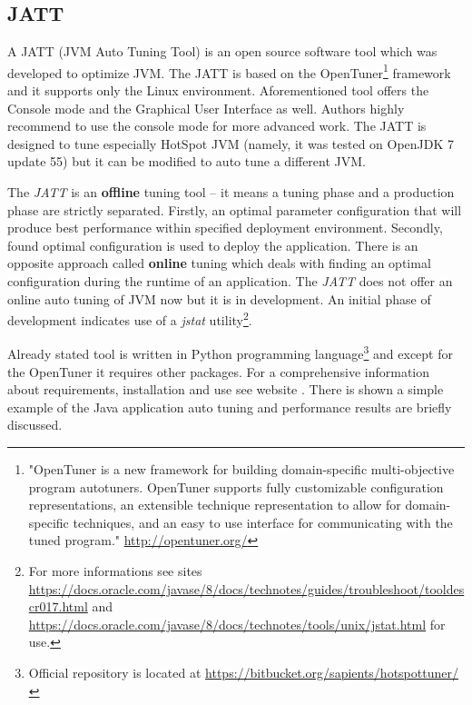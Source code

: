 \documentclass[
  digital, %
  oneside,
  notable, %
  nolof,     %
  nolot     %
]{fithesis3}
\begin{document}
\subsection{JATT}\label{jatt}
A JATT (JVM Auto Tuning Tool) is an open source software tool which was developed to optimize JVM. The JATT is based on the OpenTuner\footnote{"OpenTuner is a new framework for building domain-specific multi-objective program autotuners. OpenTuner supports fully customizable configuration representations, an extensible technique representation to allow for domain-specific techniques, and an easy to use interface for communicating with the tuned program." \url{http://opentuner.org/}} framework and it supports only the Linux environment. Aforementioned tool offers the Console mode and the Graphical User Interface as well. Authors highly recommend to use the console mode for more advanced work. The JATT is designed to tune especially HotSpot JVM (namely, it was tested on OpenJDK 7 update 55) but it can be modified to auto tune a different JVM.
\cite{jatt-web} \cite{jatt-web-dzone}

The \textit{JATT} is an \textbf{offline} tuning tool -- it means a tuning phase and a production phase are strictly separated. Firstly, an optimal parameter configuration that will produce best performance within specified deployment environment. Secondly, found optimal configuration is used to deploy the application. There is an opposite approach called \textbf{online} tuning which deals with finding an optimal configuration during the runtime of an application. The \textit{JATT} does not offer an online auto tuning of JVM now but it is in development. 
An initial phase of development indicates use of a \textit{jstat} utility\footnote{For more informations see sites \url{https://docs.oracle.com/javase/8/docs/technotes/guides/troubleshoot/tooldescr017.html} and \url{https://docs.oracle.com/javase/8/docs/technotes/tools/unix/jstat.html} for use.}. \cite{jatt}

Already stated tool is written in Python programming language\footnote{Official repository is located at \url{https://bitbucket.org/sapients/hotspottuner/}} and except for the OpenTuner it requires other packages. For a comprehensive information about requirements, installation and use see website \cite{jatt-web-medium}. There is shown a simple example of the Java application auto tuning and performance results are briefly discussed.
\end{document}
